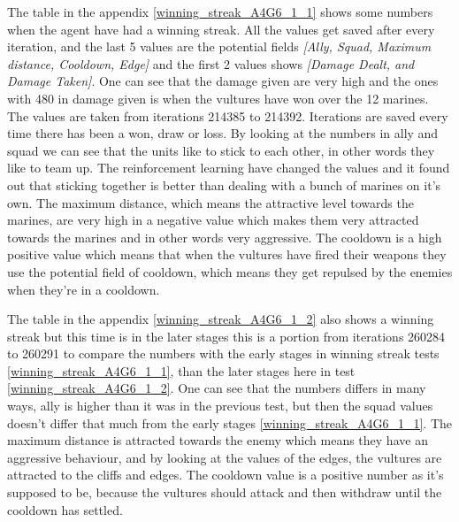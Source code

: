 

The table in the appendix \ref{winning_streak_A4G6_1_1} shows some numbers when the agent have had a winning streak. All the values get saved after every iteration, and the last 5 values are the potential fields \textit{[Ally, Squad, Maximum distance, Cooldown, Edge]} and the first 2 values shows \textit{[Damage Dealt, and Damage Taken]}. One can see that the damage given are very high and the ones with 480 in damage given is when the vultures have won over the 12 marines. The values are taken from iterations 214385 to 214392. Iterations are saved every time there has been a won, draw or loss. By looking at the numbers in ally and squad we can see that the units like to stick to each other, in other words they like to team up. The reinforcement learning have changed the values and it found out that sticking together is better than dealing with a bunch of marines on it's own. The maximum distance, which means the attractive level towards the marines, are very high in a negative value which makes them very attracted towards the marines and in other words very aggressive. The cooldown is a high positive value which means that when the vultures have fired their weapons they use the potential field of cooldown, which means they get repulsed by the enemies when they're in a cooldown. 






The table in the appendix \ref{winning_streak_A4G6_1_2} also shows a winning streak but this time is in the later stages this is a portion from iterations 260284 to 260291 to compare the numbers with the early stages in winning streak tests \ref{winning_streak_A4G6_1_1}, than the later stages here in test \ref{winning_streak_A4G6_1_2}. One can see that the numbers differs in many ways, ally is higher than it was in the previous test, but then the squad values doesn't differ that much from the early stages \ref{winning_streak_A4G6_1_1}. The maximum distance is attracted towards the enemy which means they have an aggressive behaviour, and by looking at the values of the edges, the vultures are attracted to the cliffs and edges. The cooldown value is a positive number as it's supposed to be, because the vultures should attack and then withdraw until the cooldown has settled.

